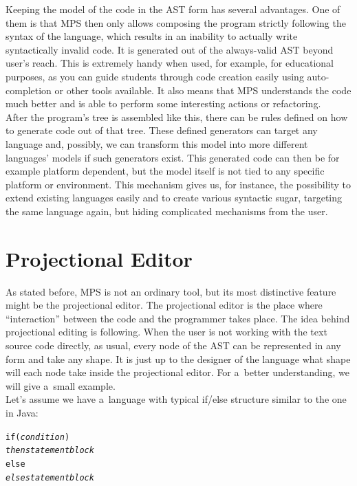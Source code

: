 Keeping the model of the code in the AST form has several advantages.
One of them is that  MPS then only allows composing the program strictly following the syntax of the language, which results in an inability to actually write syntactically invalid code.
It is generated out of the always-valid AST beyond user's reach.
This is extremely handy when used, for example, for educational purposes, as you can guide students through code creation easily using auto-completion or other tools available.
It also means that MPS understands the code much better and is able to perform some interesting actions or refactoring.
\\

After the program's tree is assembled like this, there can be rules defined on how to generate code out of that tree.
These defined generators can target any language and, possibly, we can transform this model into more different languages' models if such generators exist.
This generated code can then be for example platform dependent, but the model itself is not tied to any specific platform or environment.
This mechanism gives us, for instance, the possibility to extend existing languages easily and to create various syntactic sugar, targeting the same language again, but hiding complicated mechanisms from the user.

\section{Projectional Editor}
As stated before, MPS is not an ordinary tool, but its most distinctive feature might be the projectional editor.
The projectional editor is the place where “interaction” between the code and the programmer takes place.
The idea behind projectional editing is following.
When the user is not working with the text source code directly, as usual, every node of the AST can be represented in any form and take any shape.
It is just up to the designer of the language what shape will each node take inside the projectional editor.
For a~better understanding, we will give a~small example.
\\

Let's assume we have a~language with typical if/else structure similar to the one in Java:

\begin{center}
	\begin{minipage}{.38\textwidth}
		\begin{alltt}
			if (\textit{condition})
			    \textit{then statement block}
			else
			    \textit{else statement block}
		\end{alltt}
	\end{minipage}
\end{center}

